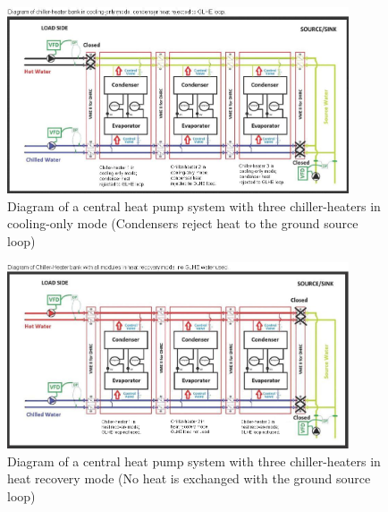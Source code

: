 \begin{figure}[hbtp] %
    \centering
    \includegraphics[width=0.9\textwidth, height=0.9\textheight, keepaspectratio=true]{media/image185.png}
    \caption{Diagram of a central heat pump system with three chiller-heaters in cooling-only mode (Condensers reject heat to the ground source loop) \protect \label{fig:diagram-of-a-central-heat-pump-system-with}}
\end{figure}

\begin{figure}[hbtp] %
    \centering
    \includegraphics[width=0.9\textwidth, height=0.9\textheight, keepaspectratio=true]{media/image186.png}
    \caption{Diagram of a central heat pump system with three chiller-heaters in heat recovery mode         (No heat is exchanged with the ground source loop) \protect \label{fig:diagram-of-a-central-heat-pump-system-with-001}}
\end{figure}

